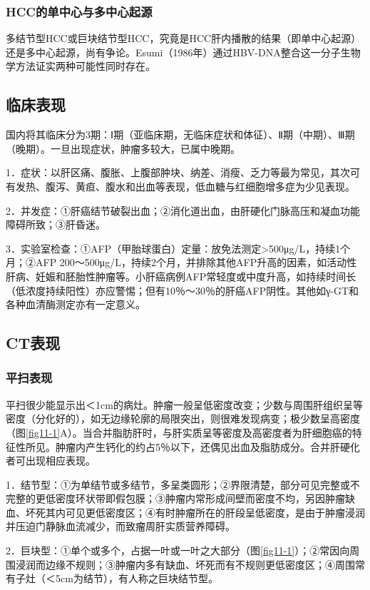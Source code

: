 \subsubsection{HCC的单中心与多中心起源}

多结节型HCC或巨块结节型HCC，究竟是HCC肝内播散的结果（即单中心起源）还是多中心起源，尚有争论。Esumi（1986年）通过HBV-DNA整合这一分子生物学方法证实两种可能性同时存在。

\subsection{临床表现}

国内将其临床分为3期：Ⅰ期（亚临床期，无临床症状和体征）、Ⅱ期（中期）、Ⅲ期（晚期）。一旦出现症状，肿瘤多较大，已属中晚期。

1．症状：以肝区痛、腹胀、上腹部肿块、纳差、消瘦、乏力等最为常见，其次可有发热、腹泻、黄疸、腹水和出血等表现，低血糖与红细胞增多症为少见表现。

2．并发症：①肝癌结节破裂出血；②消化道出血，由肝硬化门脉高压和凝血功能障碍所致；③肝昏迷。

3．实验室检查：①AFP（甲胎球蛋白）定量：放免法测定\textgreater{}500μg/L，持续1个月；②AFP
200～500μg/L，持续2个月，并排除其他AFP升高的因素，如活动性肝病、妊娠和胚胎性肿瘤等。小肝癌病例AFP常轻度或中度升高，如持续时间长（低浓度持续阳性）亦应警惕；但有10％～30％的肝癌AFP阴性。其他如γ-GT和各种血清酶测定亦有一定意义。

\subsection{CT表现}

\subsubsection{平扫表现}

平扫很少能显示出＜1cm的病灶。肿瘤一般呈低密度改变；少数与周围肝组织呈等密度（分化好的），如无边缘轮廓的局限突出，则很难发现病变；极少数呈高密度（图\ref{fig11-1}A）。当合并脂肪肝时，与肝实质呈等密度及高密度者为肝细胞癌的特征性所见。肿瘤内产生钙化的约占5％以下，还偶见出血及脂肪成分。合并肝硬化者可出现相应表现。

1．结节型：①为单结节或多结节，多呈类圆形；②界限清楚，部分可见完整或不完整的更低密度环状带即假包膜；③肿瘤内常形成间壁而密度不均，另因肿瘤缺血、坏死其内可见更低密度区；④有时肿瘤所在的肝段呈低密度，是由于肿瘤浸润并压迫门静脉血流减少，而致瘤周肝实质营养障碍。

2．巨块型：①单个或多个，占据一叶或一叶之大部分（图\ref{fig11-1}）；②常因向周围浸润而边缘不规则；③肿瘤内多有缺血、坏死而有不规则更低密度区；④周围常有子灶（＜5cm为结节），有人称之巨块结节型。

